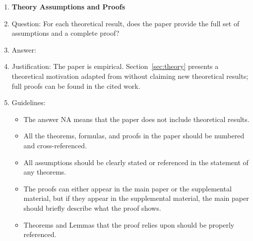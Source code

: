 \documentclass{article}
\begin{document}
\begin{enumerate}
\item {\bf Theory Assumptions and Proofs}
\item[] Question: For each theoretical result, does the paper provide the full set of assumptions and a complete proof?
\item[] Answer: \answerNA{}
\item[] Justification: The paper is empirical. Section~\ref{sec:theory} presents a theoretical motivation adapted from \citet{askarihemmat2024quantization} without claiming new theoretical results; full proofs can be found in the cited work.
\item[] Guidelines:
\begin{itemize}
    \item The answer NA means that the paper does not include theoretical results.
    \item All the theorems, formulas, and proofs in the paper should be numbered and cross-referenced.
    \item All assumptions should be clearly stated or referenced in the statement of any theorems.
    \item The proofs can either appear in the main paper or the supplemental material, but if they appear in the supplemental material, the main paper should briefly describe what the proof shows.
    \item Theorems and Lemmas that the proof relies upon should be properly referenced.
\end{itemize}


\end{enumerate}
\end{document}
